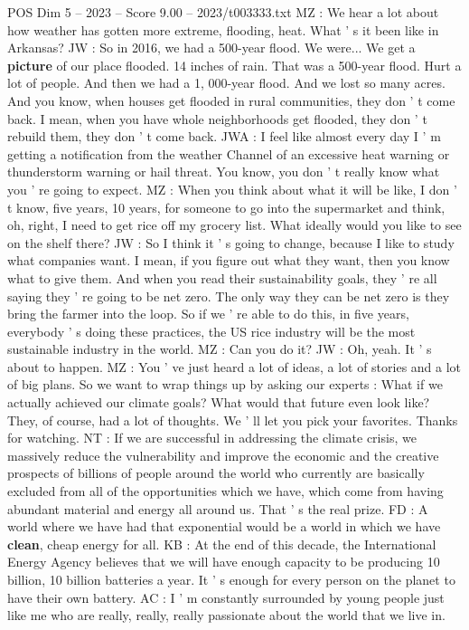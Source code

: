 \begin{textsample}{POS Dim 5 – 2023 – Score 9.00 – 2023/t003333.txt}
MZ : We hear a lot about how weather has gotten more extreme, flooding, heat.
What ' s it been like in Arkansas?
JW : So in 2016, we had a 500-year flood.
We were...
We get a \textbf{picture} of our place flooded. 14 inches of rain.
That was a 500-year flood.
Hurt a lot of people.
And then we had a 1, 000-year flood.
And we lost so many acres.
And you know, when houses get flooded in rural communities, they don ' t come back.
I mean, when you have whole neighborhoods get flooded, they don ' t rebuild them, they don ' t come back.
JWA : I feel like almost every day I ' m getting a notification from the weather Channel of an excessive heat warning or thunderstorm warning or hail threat.
You know, you don ' t really know what you ' re going to expect.
MZ : When you think about what it will be like, I don ' t know, five years, 10 years, for someone to go into the supermarket and think, oh, right, I need to get rice off my grocery list.
What ideally would you like to see on the shelf there?
JW : So I think it ' s going to change, because I like to study what companies want.
I mean, if you figure out what they want, then you know what to give them.
And when you read their sustainability goals, they ' re all saying they ' re going to be net zero.
The only way they can be net zero is they bring the farmer into the loop.
So if we ' re able to do this, in five years, everybody ' s doing these practices, the US rice industry will be the most sustainable industry in the world.
MZ : Can you do it?
JW : Oh, yeah.
It ' s about to happen.
MZ : You ' ve just heard a lot of ideas, a lot of stories and a lot of big plans.
So we want to wrap things up by asking our experts : What if we actually achieved our climate goals?
What would that future even look like?
They, of course, had a lot of thoughts.
We ' ll let you pick your favorites.
Thanks for watching.
NT : If we are successful in addressing the climate crisis, we massively reduce the vulnerability and improve the economic and the creative prospects of billions of people around the world who currently are basically excluded from all of the opportunities which we have, which come from having abundant material and energy all around us.
That ' s the real prize.
FD : A world where we have had that exponential would be a world in which we have \textbf{clean}, cheap energy for all.
KB : At the end of this decade, the International Energy Agency believes that we will have enough capacity to be producing 10 billion, 10 billion batteries a year.
It ' s enough for every person on the planet to have their own battery.
AC : I ' m constantly surrounded by young people just like me who are really, really, really passionate about the world that we live in.

\end{textsample}
